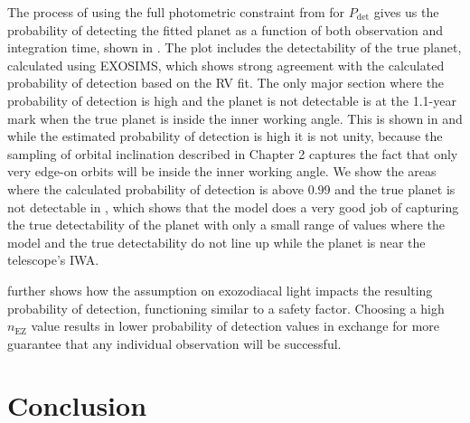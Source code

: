 The process of using the full photometric constraint from 
for $P_\textrm{det}$ gives us the probability of detecting the fitted planet as
a function of both observation and integration time, shown in
. The plot includes the detectability of
the true planet, calculated using EXOSIMS, which shows strong agreement with
the calculated probability of detection based on the RV fit. The only major
section where the probability of detection is high and the planet is not
detectable is at the 1.1-year mark when the true planet is inside the inner
working angle. This is shown in  and while
the estimated probability of detection is high it is not unity, because the
sampling of orbital inclination described in Chapter 2 captures the fact that
only very edge-on orbits will be inside the inner working angle. We show the
areas where the calculated probability of detection is above 0.99 and the true
planet is not detectable in , which shows that
the model does a very good job of capturing the true detectability of the
planet with only a small range of values where the model and the true
detectability do not line up while the planet is near the telescope's IWA.

 further shows how the assumption on
exozodiacal light impacts the resulting probability of detection, functioning
similar to a safety factor. Choosing a high $n_\textrm{EZ}$ value results in
lower probability of detection values in exchange for more guarantee that
any individual observation will be successful.


\section{Conclusion} %
\label{sec:con_ddMag_comp}

